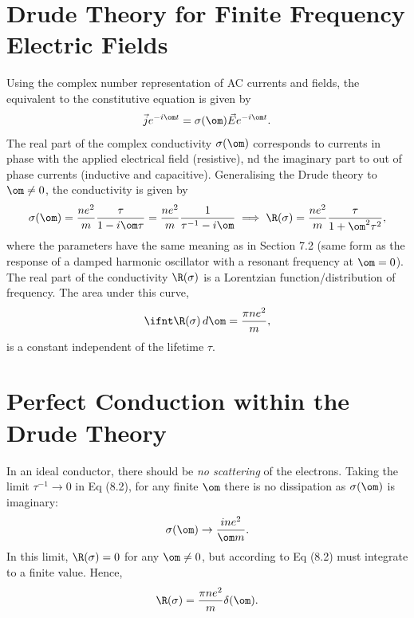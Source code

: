 \documentclass[a4paper, 11pt, normalem]{report}
\begin{document}
\section{Drude Theory for Finite Frequency Electric Fields}
Using the complex number representation of AC currents and fields, the equivalent to the constitutive equation is given by
\begin{align}
    \vec{j}e^{-i\om t} = \sigma(\om)\vec{E}e^{-i\om t}.
\end{align}
The real part of the complex conductivity $\sigma(\om)$ corresponds to currents in phase with the applied electrical field (resistive), nd the imaginary part to out of phase currents (inductive and capacitive).
Generalising the Drude theory to $\om\neq0$, the conductivity is given by
\begin{align}
    \sigma(\om) = \frac{ne^2}{m}\frac{\tau}{1-i\om\tau} = \frac{ne^2}{m}\frac{1}{\tau^{-1}-i\om} \implies \R(\sigma) = \frac{ne^2}{m}\frac{\tau}{1+\om^2\tau^2},
\end{align}
where the parameters have the same meaning as in Section 7.2 (same form as the response of a damped harmonic oscillator with a resonant frequency at $\om=0$).
The real part of the conductivity $\R(\sigma)$ is a Lorentzian function/distribution of frequency.
The area under this curve,
\begin{align}
    \ifnt \R(\sigma)\,d\om = \frac{\pi ne^2}{m},
\end{align}
is a constant independent of the lifetime $\tau$.

\section{Perfect Conduction within the Drude Theory}
In an ideal conductor, there should be \emph{no scattering} of the electrons.
Taking the limit $\tau^{-1}\to0$ in Eq (8.2), for any finite $\om$ there is no dissipation as $\sigma(\om)$ is imaginary:
\begin{align}
    \sigma(\om) \to \frac{ine^2}{\om m}.
\end{align}
In this limit, $\R(\sigma)=0$ for any $\om\neq0$, but according to Eq (8.2) must integrate to a finite value.
Hence,
\begin{align}
    \R(\sigma) = \frac{\pi ne^2}{m}\delta(\om).
\end{align}
\end{document}
